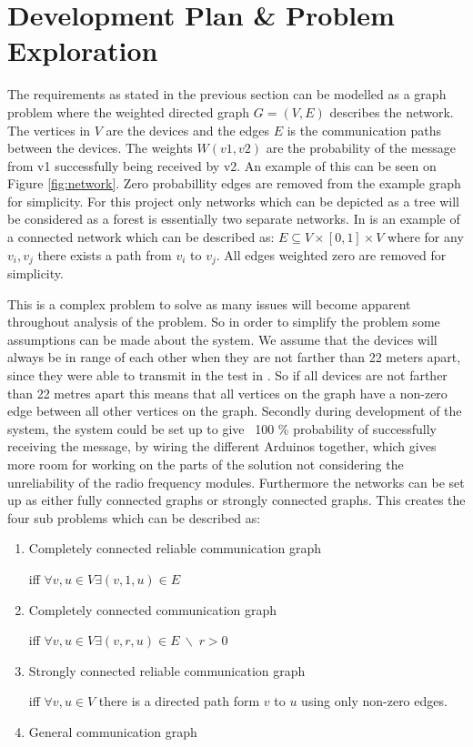 \section{Development Plan \& Problem Exploration}

\noindent The requirements as stated in the previous section can be modelled as a graph problem where the weighted directed graph $G = (V, E)$ describes the network. 
The vertices in $V$ are the devices and the edges $E$ is the communication paths between the devices. 
The weights $W(v1, v2)$ are the probability of the message from v1 successfully being received by v2.
An example of this can be seen on Figure \ref{fig:network}.
Zero probabillity edges are removed from the example graph for simplicity. 
For this project only networks which can be depicted as a tree will be considered as a forest is essentially two separate networks.
In  is an example of a connected network which can be described as: $E \subseteq V \times [0,1] \times V$ where for any $v_i, v_j$ there exists a path from $v_i$ to $v_j$.
All edges weighted zero are removed for simplicity.


\noindent This is a complex problem to solve as many issues will become apparent throughout analysis of the problem.
So in order to simplify the problem some assumptions can be made about the system.
We assume that the devices will always be in range of each other when they are not farther than 22 meters apart, since they were able to transmit in the test in  .
So if all devices are not farther than 22 metres apart this means that all vertices on the graph have a non-zero edge between all other vertices on the graph.
Secondly during development of the system, the system could be set up to give ~100 \% probability of successfully receiving the message, by wiring the different Arduinos together, which gives more room for working on the parts of the solution not considering the unreliability of the radio frequency modules.
Furthermore the networks can be set up as either fully connected graphs or strongly connected graphs.
This creates the four sub problems which can be described as:  %

\begin{enumerate}
    \item Completely connected reliable communication graph
    
    iff $\forall v, u \in V \exists (v,1,u)\in E$
    \item Completely connected communication graph
    
    iff $\forall v, u \in V \exists (v,r,u)\in E\: \backslash \; r>0$
    \item Strongly connected reliable communication graph
    
    iff $\forall v, u \in V $ there is a directed path form $v$ to $u$ using only non-zero edges.
    
    \item General communication graph
\end{enumerate}

